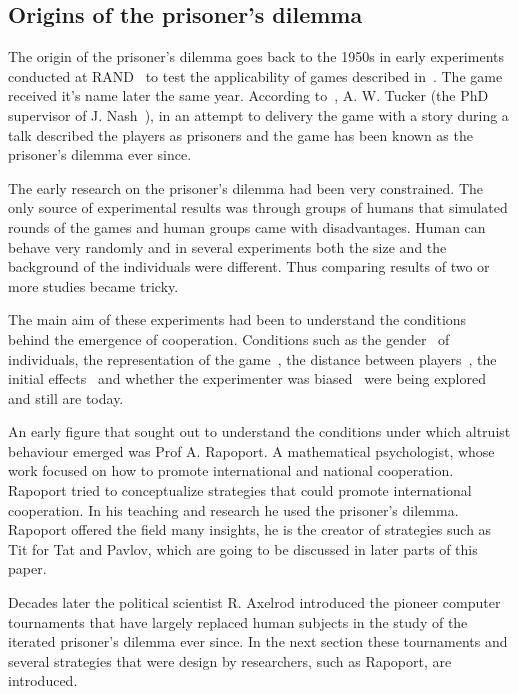 \documentclass{article}
\theoremstyle{definition}
\begin{document}
\subsection{Origins of the prisoner's dilemma}\label{section:origin}

The origin of the prisoner's dilemma goes back to the 1950s in early experiments
conducted at RAND~\cite{Flood1958} to test the applicability of games
described in~\cite{VonNeumann1944}. The game received it's name later the same year.
According to~\cite{Tucker1983}, A. W. Tucker (the PhD supervisor of J. Nash~\cite{Nash1951}),
in an attempt to delivery the game with a story during a talk described the players
as prisoners and the game has been known as the prisoner's dilemma ever since.

The early research on the prisoner's dilemma had been very constrained. The only
source of experimental results was through groups of humans that simulated rounds
of the games and human groups came with disadvantages. Human can behave very
randomly and in several experiments both the size and the background of the
individuals were different. Thus comparing results of two or more studies
became tricky.

The main aim of these experiments had been to understand the conditions behind
the emergence of cooperation. Conditions such as the gender~\cite{Evans1966, Lutzker1961, Mack1971} of
individuals, the representation of the game~\cite{Evans1966}, the distance between
players~\cite{Sensenig1972}, the initial effects~\cite{Tedeschi1968} and whether
the experimenter was biased~\cite{Gallo1968} were being explored and still are
today.

An early figure that sought out to understand the conditions under which altruist
behaviour emerged was Prof A. Rapoport. A mathematical psychologist, whose work focused on
how to promote international and national cooperation. Rapoport tried to conceptualize
strategies that could promote international cooperation. In his teaching and research
he used the prisoner's dilemma. Rapoport offered the field many insights, he
is the creator of strategies such as Tit for Tat and Pavlov, which are going to be
discussed in later parts of this paper.

Decades later the political scientist R. Axelrod introduced the 
pioneer computer tournaments that have largely replaced human subjects in the study
of the iterated prisoner's dilemma ever since. In the next section  these
tournaments and several strategies that were design by researchers,
such as Rapoport, are introduced.
\end{document}
